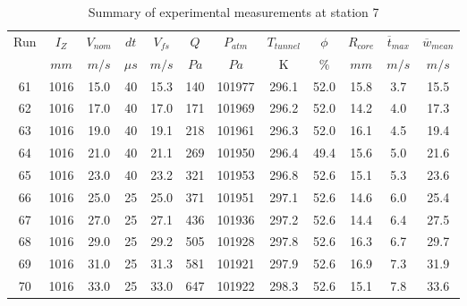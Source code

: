 \begin{table}[H]
\begin{center}
\begin{tabular}{|cccccccccccc|}
	\hline
	Run & $I_Z$ & $V_{nom}$ & $dt$ & $V_{fs}$ & $Q$ & $P_{atm}$ & $T_{tunnel}$ & $\phi$ & $R_{core}$ & $\overline{t}_{max}$ & $\overline{w}_{mean}$\\
	  & $mm$ & $m/s$ & $\mu s$ & $m/s$ & $Pa$ & $Pa$ & K & $\%$ & $mm$ & $m/s$ & $m/s$\\
	\hline
	61 & 1016 & 15.0 & 40 & 15.3 & 140 & 101977 & 296.1 & 52.0 & 15.8 & 3.7 & 15.5\\
	62 & 1016 & 17.0 & 40 & 17.0 & 171 & 101969 & 296.2 & 52.0 & 14.2 & 4.0 & 17.3\\
	63 & 1016 & 19.0 & 40 & 19.1 & 218 & 101961 & 296.3 & 52.0 & 16.1 & 4.5 & 19.4\\
	64 & 1016 & 21.0 & 40 & 21.1 & 269 & 101950 & 296.4 & 49.4 & 15.6 & 5.0 & 21.6\\
	65 & 1016 & 23.0 & 40 & 23.2 & 321 & 101953 & 296.8 & 52.6 & 15.1 & 5.3 & 23.6\\
	66 & 1016 & 25.0 & 25 & 25.0 & 371 & 101951 & 297.1 & 52.6 & 14.6 & 6.0 & 25.4\\
	67 & 1016 & 27.0 & 25 & 27.1 & 436 & 101936 & 297.2 & 52.6 & 14.4 & 6.4 & 27.5\\
	68 & 1016 & 29.0 & 25 & 29.2 & 505 & 101928 & 297.8 & 52.6 & 16.3 & 6.7 & 29.7\\
	69 & 1016 & 31.0 & 25 & 31.3 & 581 & 101921 & 297.9 & 52.6 & 16.9 & 7.3 & 31.9\\
	70 & 1016 & 33.0 & 25 & 33.0 & 647 & 101922 & 298.3 & 52.6 & 15.1 & 7.8 & 33.6\\
	\hline
\end{tabular}
\caption{Summary of experimental measurements at station 7}
\label{table:experiment_results_7}
\end{center}
\end{table}
